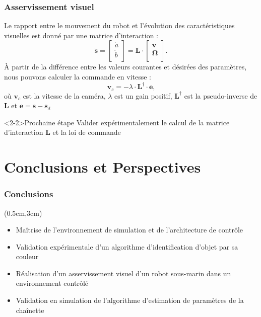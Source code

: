 \documentclass[10pt]{beamer}
\begin{document}
\begin{frame}
\frametitle{Asservissement visuel}
Le rapport entre le mouvement du robot et l'évolution des caractéristiques visuelles est donné par une matrice d’interaction :
\begin{equation*}
\dot{\mathbf{s}} = 
\begin{bmatrix}
	\dot{a} \\[0.3em]
	\dot{b} \\[0.3em]
\end{bmatrix}%
= \mathbf{L}\cdot %
\begin{bmatrix}
	{\mathbf{v}} \\[0.3em]
	{\mathbf{\Omega}} \\[0.3em]
\end{bmatrix}
\text{.}
\end{equation*}
À partir de la différence entre les valeurs courantes et désirées des paramètres, nous pouvons calculer la commande en vitesse :
\begin{equation*}
\mathbf{v}_c
= -\lambda\cdot\mathbf{L}^{\dagger}\cdot \mathbf{e}
\text{,}
\end{equation*}
où $\mathbf{v}_c$ est la vitesse de la caméra, $\lambda$ est un gain positif, $\mathbf{L}^{\dagger}$ est la pseudo-inverse de $\mathbf{L}$ et $\mathbf{e} = \mathbf{s} - \mathbf{s}_d$
\begin{block}<2-2>{Prochaine étape}
Valider expérimentalement le calcul de la matrice d'interaction $\mathbf{L}$ et la loi de commande
\end{block}
\end{frame}

\section{Conclusions et Perspectives}

\begin{frame}
\frametitle{Conclusions}
\begin{textblock*}{12cm}(0.5cm,3cm) %
\begin{itemize}
\item Maîtrise de l'environnement de simulation et de l'architecture de contrôle
\item Validation expérimentale d'un algorithme d'identification d'objet par sa couleur
\item Réalisation d'un asservissement visuel d'un robot sous-marin dans un environnement contrôlé
\item Validation en simulation de l'algorithme d'estimation de paramètres de la chaînette
\end{itemize}
\end{textblock*}
\end{frame}
\end{document}
